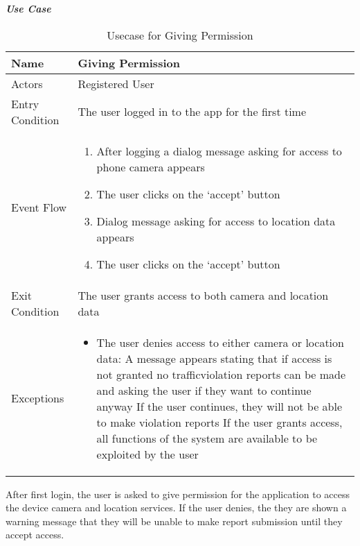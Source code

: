 \begin{table}[H]
\begin{flushleft}\emph{\textbf{Use Case}}\end{flushleft}
\footnotesize
\centering
\settowidth{}
\setlength\extrarowheight{2pt}
\begin{tabulary}{\textwidth}{|J|J|}
\hline
Name            & Giving Permission \\
\hline 
Actors          & Registered User \\
\hline 
Entry Condition & The user logged in to the app for the first time \\
\hline 
Event Flow      & 
\begin{minipage}[t]{0.7\textwidth}
\begin{enumerate} 
\item After logging a dialog message asking for access to phone camera appears
\item The user clicks on the ‘accept’ button
\item Dialog message asking for access to location data appears
\item The user clicks on the ‘accept’ button
\end{enumerate}
\end{minipage}\\
\hline

Exit Condition  & The user grants access to both camera and location data \\
\hline 
Exceptions      & 
\begin{minipage}[t]{0.8\textwidth}
\begin{itemize} 
\item The user denies access to either camera or location data: A message appears stating that if access is not granted no trafficviolation reports can be made and asking the user if they want to continue anyway If the user continues, they will not be able to make violation reports If the user grants access, all functions of the system are available to be exploited by the user
\end{itemize}
\end{minipage}\\
\hline
\end{tabulary}
\caption{\label{tab:Usecase-Give-Permission}Usecase for Giving Permission}
\end{table}

After first login, the user is asked to give permission for the application to access the device camera and location services. If the user denies, the they are shown a warning message that they will be unable to make report submission until they accept access.

